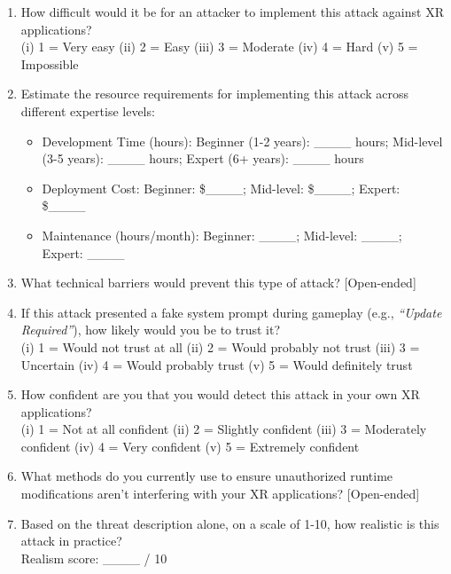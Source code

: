 \documentclass[letterpaper,twocolumn,10pt]{article}
\begin{document}
\begin{enumerate}
    \item[Q1.] How difficult would it be for an attacker to implement this attack against XR applications? \\(i) 1 = Very easy (ii) 2 = Easy (iii) 3 = Moderate (iv) 4 = Hard (v) 5 = Impossible
    
    \item[Q2.] Estimate the resource requirements for implementing this attack across different expertise levels: 
    \begin{itemize}
    \item Development Time (hours): Beginner (1-2 years): \_\_\_\_ hours; Mid-level (3-5 years): \_\_\_\_ hours; Expert (6+ years): \_\_\_\_ hours
    \item Deployment Cost: Beginner: \$\_\_\_\_; Mid-level: \$\_\_\_\_; Expert: \$\_\_\_\_
    \item Maintenance (hours/month): Beginner: \_\_\_\_; Mid-level: \_\_\_\_; Expert: \_\_\_\_
    \end{itemize}
    
    \item[Q3.] What technical barriers would prevent this type of attack? [Open-ended]
    
    \item[Q4.] If this attack presented a fake system prompt during gameplay (e.g., \textit{``Update Required''}), how likely would you be to trust it? \\(i) 1 = Would not trust at all (ii) 2 = Would probably not trust (iii) 3 = Uncertain (iv) 4 = Would probably trust (v) 5 = Would definitely trust
    
    \item[Q5.] How confident are you that you would detect this attack in your own XR applications? \\(i) 1 = Not at all confident (ii) 2 = Slightly confident (iii) 3 = Moderately confident (iv) 4 = Very confident (v) 5 = Extremely confident
    
    \item[Q6.] What methods do you currently use to ensure unauthorized runtime modifications aren't interfering with your XR applications? [Open-ended]
    
    \item[Q7.] Based on the threat description alone, on a scale of 1-10, how realistic is this attack in practice? \\Realism score: \_\_\_\_ / 10
\end{enumerate}
\end{document}
